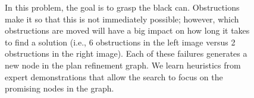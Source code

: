 \begin{figure}[t]
  \caption{\small{In this problem, the goal is to grasp the black
      can. Obstructions make it so that this is not immediately possible; however, which
      obstructions are moved will have a big impact on how long it
      takes to find a solution (i.e., 6 obstructions in the left image
      versus 2 obstructions in the right image). Each of these failures
      generates a new node in the plan refinement graph. We learn
      heuristics from expert demonstrations that allow the search to
      focus on the promising nodes in the graph.}}
  \label{fig:hlsearch}
\end{figure}

